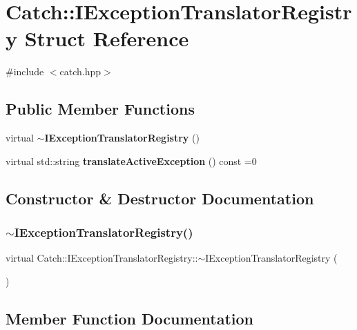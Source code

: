 \section{Catch\+::I\+Exception\+Translator\+Registry Struct Reference}
\label{struct_catch_1_1_i_exception_translator_registry}


{\ttfamily \#include $<$catch.\+hpp$>$}

\subsection*{Public Member Functions}
\begin{DoxyCompactItemize}
\item 
virtual \textbf{ $\sim$\+I\+Exception\+Translator\+Registry} ()
\item 
virtual std\+::string \textbf{ translate\+Active\+Exception} () const =0
\end{DoxyCompactItemize}


\subsection{Constructor \& Destructor Documentation}
\mbox{\label{struct_catch_1_1_i_exception_translator_registry_acf7402e18789ea46d54ea8564ac358d3}} 
\subsubsection{$\sim$IExceptionTranslatorRegistry()}
{\footnotesize\ttfamily virtual Catch\+::\+I\+Exception\+Translator\+Registry\+::$\sim$\+I\+Exception\+Translator\+Registry (\begin{DoxyParamCaption}{ }\end{DoxyParamCaption})\hspace{0.3cm}{\ttfamily [virtual]}}



\subsection{Member Function Documentation}
\mbox{\label{struct_catch_1_1_i_exception_translator_registry_af76ae8c331a17f2a94c9720bc0d686bb}} 
